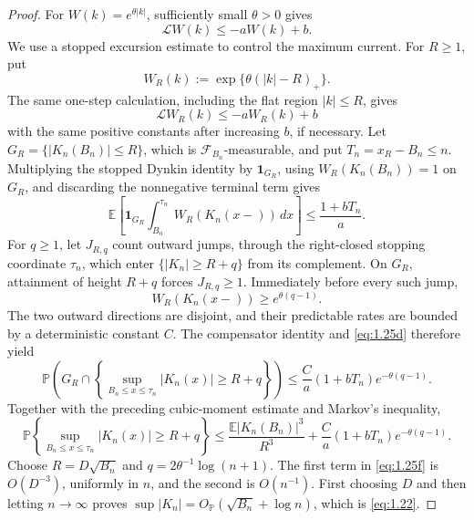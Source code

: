 \documentclass[11pt,reqno]{amsart}
\theoremstyle{definition}
\theoremstyle{remark}
\numberwithin{equation}{section}
\newcommand{\E}{\mathbb E}
\newcommand{\Pp}{\mathbb P}
\begin{document}
\begin{proof}
For \(W(k)=e^{\theta|k|}\), sufficiently small \(\theta>0\) gives
\begin{equation}
\mathcal LW(k)\le-aW(k)+b.
\label{eq:1.25}
\end{equation}
We use a stopped excursion estimate to control the maximum current.  For
\(R\ge1\), put
\[
 W_R(k):=\exp\{\theta(|k|-R)_+\}.
\]
The same one-step calculation, including the flat region \(|k|\le R\),
gives
\begin{equation}
 \mathcal L W_R(k)\le-aW_R(k)+b
\label{eq:1.25c}
\end{equation}
with the same positive constants after increasing \(b\), if necessary.
Let \(G_R=\{|K_n(B_n)|\le R\}\), which is
\(\mathcal F_{B_n}\)-measurable, and put \(T_n=x_R-B_n\le n\).
Multiplying the stopped Dynkin identity by \(\mathbf1_{G_R}\), using
\(W_R(K_n(B_n))=1\) on \(G_R\), and discarding the nonnegative terminal
term gives
\begin{equation}
 \E\left[\mathbf1_{G_R}
   \int_{B_n}^{\tau_n}W_R(K_n(x-))\,dx\right]
 \le \frac{1+bT_n}{a}.
\label{eq:1.25d}
\end{equation}
For \(q\ge1\), let \(J_{R,q}\) count outward jumps, through the
right-closed stopping coordinate \(\tau_n\), which enter
\(\{|K_n|\ge R+q\}\) from its complement.  On \(G_R\), attainment of
height \(R+q\) forces \(J_{R,q}\ge1\).  Immediately before every such
jump,
\[
 W_R(K_n(x-))\ge e^{\theta(q-1)}.
\]
The two outward directions are disjoint, and their predictable rates are
bounded by a deterministic constant \(C\).  The compensator identity and
\eqref{eq:1.25d} therefore yield
\begin{equation}
\Pp\!\left(G_R\cap
  \left\{\sup_{B_n\le x\le\tau_n}|K_n(x)|\ge R+q\right\}\right)
 \le \frac{C}{a}(1+bT_n)e^{-\theta(q-1)}.
\label{eq:1.25e}
\end{equation}
Together with the preceding cubic-moment estimate and Markov's inequality,
\begin{equation}
 \Pp\!\left\{\sup_{B_n\le x\le\tau_n}|K_n(x)|\ge R+q\right\}
 \le
 \frac{\E|K_n(B_n)|^3}{R^3}
 +\frac{C}{a}(1+bT_n)e^{-\theta(q-1)}.
\label{eq:1.25f}
\end{equation}
Choose \(R=D\sqrt{B_n}\) and
\(q=2\theta^{-1}\log(n+1)\).  The first term in \eqref{eq:1.25f} is
\(O(D^{-3})\), uniformly in \(n\), and the second is \(O(n^{-1})\).
First choosing \(D\) and then letting \(n\to\infty\) proves
\(\sup|K_n|=O_{\Pp}(\sqrt{B_n}+\log n)\), which is \eqref{eq:1.22}.


\end{proof}
\end{document}
